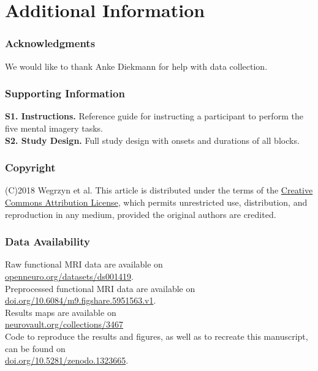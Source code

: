 \documentclass[fleqn,10pt]{SelfArx} %
\begin{document}

\section*{Additional Information}

\subsubsection*{Acknowledgments}
\small{We would like to thank Anke Diekmann for help with data collection.}

\subsubsection*{Supporting Information}
\small{
\textbf{S1. Instructions.} Reference guide for instructing a participant to perform the five mental imagery tasks. \\
\textbf{S2. Study Design.} Full study design with onsets and durations of all blocks.
}
\subsubsection*{Copyright}
\small{
(C)2018 Wegrzyn et al. This article is distributed under the terms of the \href{http://creativecommons.org/licenses/by/4.0/}{Creative Commons Attribution License}, which permits unrestricted use, distribution, and reproduction in any medium, provided the original authors are credited.  
}
\subsubsection*{Data Availability}   
\small{
Raw functional MRI data are available on  \\
\href{https://openneuro.org/datasets/ds001419}{openneuro.org/datasets/ds001419}.  \\
Preprocessed functional MRI data are available on  \\
\href{https://doi.org/10.6084/m9.figshare.5951563.v1}{doi.org/10.6084/m9.figshare.5951563.v1}.  \\
Results maps are available on \\
\href{https://neurovault.org/collections/3467}{neurovault.org/collections/3467}  \\
Code to reproduce the results and figures, as well as to recreate this manuscript, can be found on  \\
\href{https://doi.org/10.5281/zenodo.1323665}{doi.org/10.5281/zenodo.1323665}.  
}


\renewcommand*{\bibfont}{\footnotesize}



\end{document}
